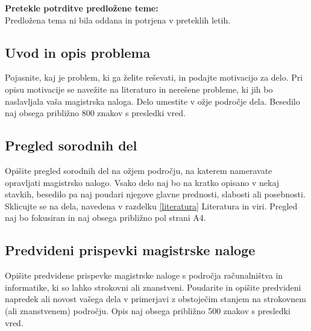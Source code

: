 \documentclass[a4paper, 12pt]{article}
\begin{document}

\textbf{Pretekle potrditve predložene teme:}\\
Predložena tema ni bila oddana in potrjena v preteklih letih.

\subsection{Uvod in opis problema}

Pojasnite, kaj je problem, ki ga želite reševati, in podajte motivacijo za delo. Pri opisu motivacije se navežite na literaturo in nerešene probleme, ki jih bo naslavljala vaša magistrska naloga. Delo umestite v ožje področje dela. Besedilo naj obsega približno 800 znakov s presledki vred.

\subsection{Pregled sorodnih del}

Opišite pregled sorodnih del na ožjem področju, na katerem nameravate opravljati magistrsko nalogo. Vsako delo naj bo na kratko opisano v nekaj stavkih, besedilo pa naj poudari njegove glavne prednosti, slabosti ali posebnosti. Sklicujte se na dela, navedena v razdelku \ref{literatura} Literatura in viri. Pregled naj bo fokusiran in naj obsega približno pol strani A4.

\subsection{Predvideni prispevki magistrske naloge}

Opišite predvidene prispevke magistrske naloge s področja računalništva in informatike, ki so lahko strokovni ali znanstveni. Poudarite in opišite predvideni napredek ali novost vašega dela v primerjavi z obstoječim stanjem na strokovnem (ali znanstvenem) področju. Opis naj obsega približno 500 znakov s presledki vred.
\end{document}
